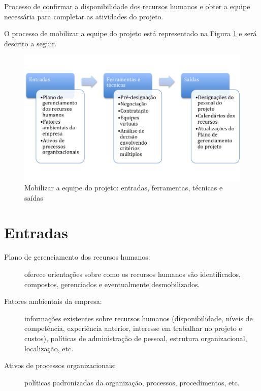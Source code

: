 Processo de confirmar a disponibilidade dos recursos humanos e obter a equipe necessária para completar as atividades do projeto.

O processo de mobilizar a equipe do projeto está representado na Figura \ref{fig:rh:mob:efts} e será descrito a seguir.

\begin{figure}[!h]
	\centering
	\includegraphics[scale=0.5]{Figuras/rh_efts_mobilizar.png}
	\caption{Mobilizar a equipe do projeto: entradas, ferramentas, técnicas e saídas}
	\label{fig:rh:mob:efts}
\end{figure}

\section{Entradas}

\begin{description}

	\item[Plano de gerenciamento dos recursos humanos:] oferece orientações sobre como os recursos humanos são identificados, compostos, gerenciados e eventualmente desmobilizados.
	
	\item[Fatores ambientais da empresa:] informações existentes sobre recursos humanos (disponibilidade, níveis de competência, experiência anterior, interesse em trabalhar no projeto e custos), políticas de administração de pessoal, estrutura organizacional, localização, etc.
	
	\item[Ativos de processos organizacionais:] políticas padronizadas da organização, processos, procedimentos, etc.
	
\end{description}

